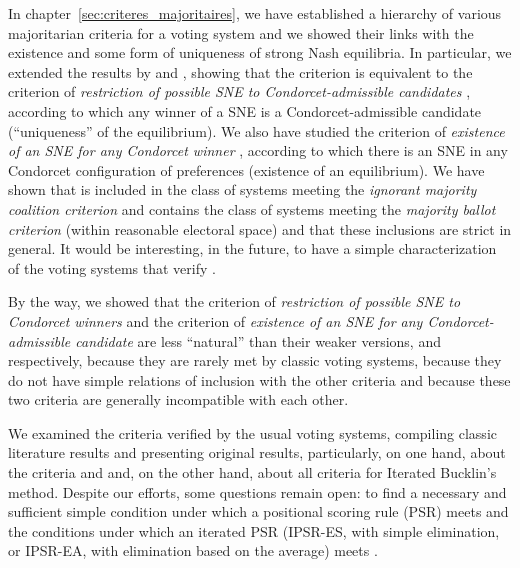 \medskip
In chapter~\ref{sec:criteres_majoritaires}, we have established a hierarchy of various majoritarian criteria for a voting system and we showed their links with the existence and some form of uniqueness of strong Nash equilibria. In particular, we extended the results by \cite{sertel2004strong} and \cite{brill2015strategic}, showing that the criterion \cminf{} is equivalent to the criterion of \emph{restriction of possible SNE to Condorcet-admissible candidates} \renfadm{}, according to which any winner of a SNE is a Condorcet-admissible candidate (``uniqueness'' of the equilibrium). We also have studied the criterion of \emph{existence of an SNE for any Condorcet winner} \eenfcond{}, according to which there is an SNE in any Condorcet configuration of preferences (existence of an equilibrium). We have shown that \eenfcond{} is included in the class \cmign{} of systems meeting the \emph{ignorant majority coalition criterion} and contains the class \bulmaj{} of systems meeting the \emph{majority ballot criterion} (within reasonable electoral space) and that these inclusions are strict in general. It would be interesting, in the future, to have a simple characterization of the voting systems that verify \eenfcond{}.

By the way, we showed that the criterion of \emph{restriction of possible SNE to Condorcet winners} \renfcond{} and the criterion of \emph{existence of an SNE for any Condorcet-admissible candidate} \eenfadm{} are less ``natural'' than their weaker versions, \renfadm{} and \eenfcond{} respectively, because they are rarely met by classic voting systems, because they do not have simple relations of inclusion with the other criteria and because these two criteria are generally incompatible with each other.

We examined the criteria verified by the usual voting systems, compiling classic literature results and presenting original results, particularly, on one hand, about the criteria \cminf{} and \rcond{} and, on the other hand, about all criteria for Iterated Bucklin's method. Despite our efforts, some questions remain open: to find a necessary and sufficient simple condition under which a positional scoring rule (PSR) meets \cminf{} and the conditions under which an iterated PSR (IPSR-ES, with simple elimination, or IPSR-EA, with elimination based on the average) meets \rcond{}.

